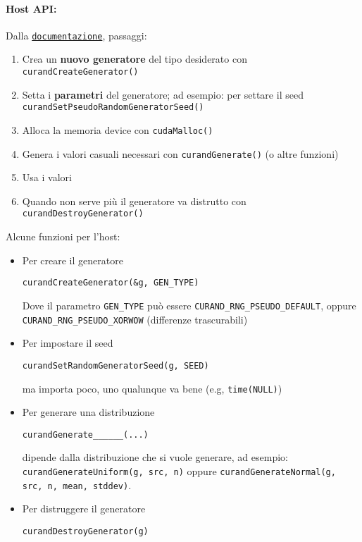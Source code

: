 \paragraph{Host API:} Dalla \href{https://docs.nvidia.com/cuda/curand/index.html}{\texttt{documentazione}}, passaggi:
\begin{enumerate}
	\item Crea un \textbf{nuovo generatore} del tipo desiderato con \texttt{curandCreateGenerator()}
	
	\item Setta i \textbf{parametri} del generatore; ad esempio: per settare il seed \texttt{curandSetPseudoRandomGeneratorSeed()}
	
	\item Alloca la memoria device con \texttt{cudaMalloc()}
	
	\item Genera i valori casuali necessari con \texttt{curandGenerate()} (o altre funzioni)
	
	\item Usa i valori
	
	\item Quando non serve più il generatore va distrutto con \texttt{curandDestroyGenerator()}
\end{enumerate}

Alcune funzioni per l'host: 
\begin{itemize}
	\item Per creare il generatore
	\begin{verbatim}
curandCreateGenerator(&g, GEN_TYPE)
	\end{verbatim}
	Dove il parametro \texttt{GEN\_TYPE} può essere \texttt{CURAND\_RNG\_PSEUDO\_DEFAULT}, oppure \texttt{CURAND\_RNG\_PSEUDO\_XORWOW} (differenze trascurabili)
	
	\item Per impostare il seed
	\begin{verbatim}
curandSetRandomGeneratorSeed(g, SEED)
	\end{verbatim}
	ma importa poco, uno qualunque va bene (e.g, \texttt{time(NULL)})
	
	\item Per generare una distribuzione
	\begin{verbatim}
curandGenerate______(...)
	\end{verbatim}
	dipende dalla distribuzione che si vuole generare, ad esempio: \texttt{curandGenerateUniform(g, src, n)} oppure \texttt{curandGenerateNormal(g, src, n, mean, stddev)}. 

	\item Per distruggere il generatore
	\begin{verbatim}
curandDestroyGenerator(g)
	\end{verbatim}
\end{itemize}

